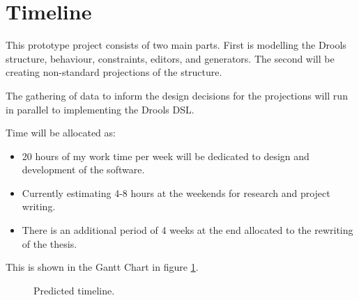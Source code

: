 \section{Timeline}

This prototype project consists of two main parts.
First is modelling the Drools structure, behaviour, constraints, editors, and generators.
The second will be creating non-standard projections of the structure.

The gathering of data to inform the design decisions for the projections will run in parallel to implementing the Drools DSL.

Time will be allocated as:
\begin{itemize}
    \item 20 hours of my work time per week will be dedicated to design and development of the software.
    \item Currently estimating 4-8 hours at the weekends for research and project writing.
    \item There is an additional period of 4 weeks at the end allocated to the rewriting of the thesis.
\end{itemize}

This is shown in the Gantt Chart in figure \ref{fig:ganttchart}.

\begin{figure}[H]
    \centering
    \caption{Predicted timeline.}
    \label{fig:ganttchart}
\end{figure}
